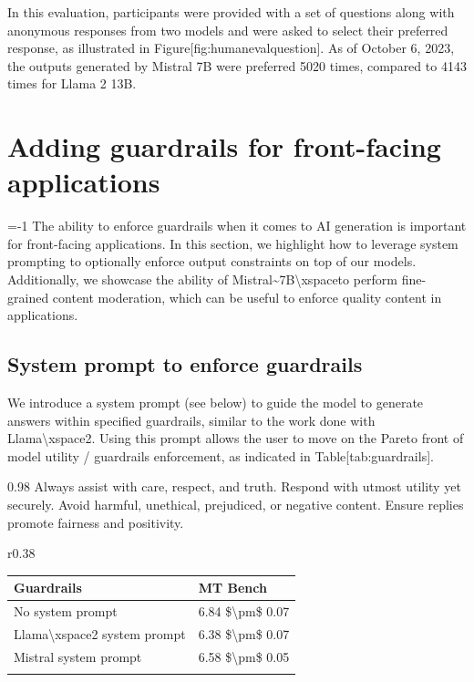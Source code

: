 \documentclass[11pt,a4paper]{article}
\begin{document}
In this evaluation, participants were provided with a set of questions along with anonymous responses from two models and were asked to select their preferred response, as illustrated in Figure[fig:humanevalquestion]. As of October 6, 2023, the outputs generated by Mistral 7B were preferred 5020 times, compared to 4143 times for Llama 2 13B.

\section{Adding guardrails for front-facing applications}

=-1 The ability to enforce guardrails when it comes to AI generation is important for front-facing applications. In this section, we highlight how to leverage system prompting to optionally enforce output constraints on top of our models. Additionally, we showcase the ability of Mistral\textasciitilde{}7B\textbackslash{}xspaceto perform fine-grained content moderation, which can be useful to enforce quality content in applications.

\subsection{System prompt to enforce guardrails}

We introduce a system prompt (see below) to guide the model to generate answers within specified guardrails, similar to the work done with Llama\textbackslash{}xspace2. Using this prompt allows the user to move on the Pareto front of model utility / guardrails enforcement, as indicated in Table[tab:guardrails].

0.98 Always assist with care, respect, and truth. Respond with utmost utility yet securely. Avoid harmful, unethical, prejudiced, or negative content. Ensure replies promote fairness and positivity.

r0.38

\begin{table}[h]
\begin{tabular}{|l|l|}
\hline
Guardrails & MT Bench \\ \hline
No system prompt & 6.84 \$\textbackslash{}pm\$ 0.07 \\ \hline
Llama\textbackslash{}xspace2 system prompt & 6.38 \$\textbackslash{}pm\$ 0.07 \\ \hline
Mistral system prompt & 6.58 \$\textbackslash{}pm\$ 0.05 \\ \hline
 &  \\ \hline
\end{tabular}
\end{table}
\end{document}
